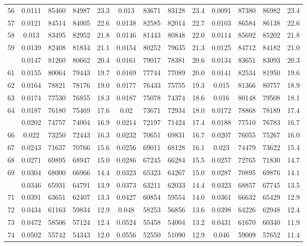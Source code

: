 \documentclass[
  14pt,
]{article}
\begin{document}
\begin{longtable}[t]{lcccccccccccc}
56 & 0.0111 & 85460 & 84987 & 23.3 & 0.013 & 83671 & 83128 & 23.4 & 0.0091 & 87380 & 86982 & 23.4\\
57 & 0.0121 & 84514 & 84005 & 22.6 & 0.0138 & 82585 & 82014 & 22.7 & 0.0103 & 86584 & 86138 & 22.6\\
58 & 0.013 & 83495 & 82952 & 21.8 & 0.0146 & 81443 & 80848 & 22.0 & 0.0114 & 85692 & 85202 & 21.8\\
59 & 0.0139 & 82408 & 81834 & 21.1 & 0.0154 & 80252 & 79635 & 21.3 & 0.0125 & 84712 & 84182 & 21.0\\
\addlinespace
60 & 0.0147 & 81260 & 80662 & 20.4 & 0.0161 & 79017 & 78381 & 20.6 & 0.0134 & 83651 & 83093 & 20.3\\
61 & 0.0155 & 80064 & 79443 & 19.7 & 0.0169 & 77744 & 77089 & 20.0 & 0.0141 & 82534 & 81950 & 19.6\\
62 & 0.0164 & 78821 & 78176 & 19.0 & 0.0177 & 76433 & 75755 & 19.3 & 0.015 & 81366 & 80757 & 18.9\\
63 & 0.0174 & 77530 & 76855 & 18.3 & 0.0187 & 75078 & 74374 & 18.6 & 0.016 & 80148 & 79508 & 18.1\\
64 & 0.0187 & 76180 & 75469 & 17.6 & 0.02 & 73671 & 72934 & 18.0 & 0.0172 & 78868 & 78189 & 17.4\\
\addlinespace
65 & 0.0202 & 74757 & 74004 & 16.9 & 0.0214 & 72197 & 71424 & 17.4 & 0.0188 & 77510 & 76783 & 16.7\\
66 & 0.022 & 73250 & 72443 & 16.3 & 0.0232 & 70651 & 69831 & 16.7 & 0.0207 & 76055 & 75267 & 16.0\\
67 & 0.0243 & 71637 & 70766 & 15.6 & 0.0256 & 69011 & 68128 & 16.1 & 0.023 & 74479 & 73622 & 15.4\\
68 & 0.0271 & 69895 & 68947 & 15.0 & 0.0286 & 67245 & 66284 & 15.5 & 0.0257 & 72765 & 71830 & 14.7\\
69 & 0.0304 & 68000 & 66966 & 14.4 & 0.0323 & 65323 & 64267 & 15.0 & 0.0287 & 70895 & 69876 & 14.1\\
\addlinespace
70 & 0.0346 & 65931 & 64791 & 13.9 & 0.0373 & 63211 & 62033 & 14.4 & 0.0323 & 68857 & 67745 & 13.5\\
71 & 0.0391 & 63651 & 62407 & 13.3 & 0.0427 & 60854 & 59554 & 14.0 & 0.0361 & 66632 & 65429 & 12.9\\
72 & 0.0434 & 61163 & 59834 & 12.9 & 0.048 & 58253 & 56856 & 13.6 & 0.0398 & 64226 & 62948 & 12.4\\
73 & 0.0472 & 58506 & 57124 & 12.4 & 0.0524 & 55458 & 54004 & 13.2 & 0.0431 & 61670 & 60340 & 11.9\\
74 & 0.0502 & 55742 & 54343 & 12.0 & 0.0556 & 52550 & 51090 & 12.9 & 0.046 & 59009 & 57652 & 11.4\\

\end{longtable}
\end{document}
